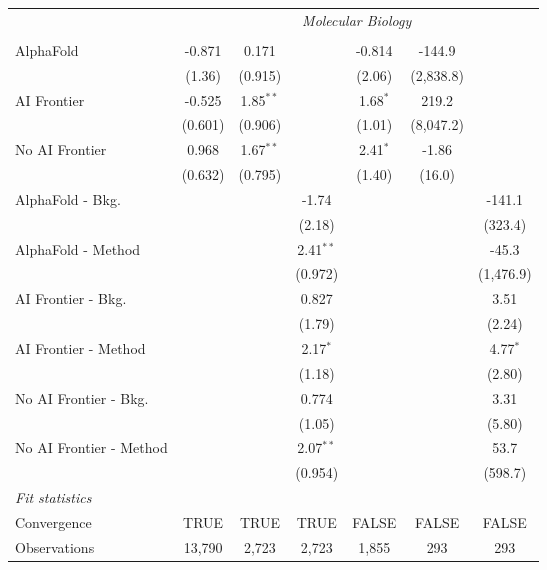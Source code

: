 \begin{tabular}{lcccccc}
 & \multicolumn{6}{c}{\textit{Molecular Biology}} \\ \\
   AlphaFold               & -0.871  & 0.171       &             & -0.814     & -144.9    &   \\   
                           & (1.36)  & (0.915)     &             & (2.06)     & (2,838.8) &   \\   
   AI Frontier             & -0.525  & 1.85$^{**}$ &             & 1.68$^{*}$ & 219.2     &   \\   
                           & (0.601) & (0.906)     &             & (1.01)     & (8,047.2) &   \\   
   No AI Frontier          & 0.968   & 1.67$^{**}$ &             & 2.41$^{*}$ & -1.86     &   \\   
                           & (0.632) & (0.795)     &             & (1.40)     & (16.0)    &   \\   
   AlphaFold - Bkg.        &         &             & -1.74       &            &           & -141.1\\   
                           &         &             & (2.18)      &            &           & (323.4)\\   
   AlphaFold - Method      &         &             & 2.41$^{**}$ &            &           & -45.3\\   
                           &         &             & (0.972)     &            &           & (1,476.9)\\   
   AI Frontier - Bkg.      &         &             & 0.827       &            &           & 3.51\\   
                           &         &             & (1.79)      &            &           & (2.24)\\   
   AI Frontier - Method    &         &             & 2.17$^{*}$  &            &           & 4.77$^{*}$\\   
                           &         &             & (1.18)      &            &           & (2.80)\\   
   No AI Frontier - Bkg.   &         &             & 0.774       &            &           & 3.31\\   
                           &         &             & (1.05)      &            &           & (5.80)\\   
   No AI Frontier - Method &         &             & 2.07$^{**}$ &            &           & 53.7\\   
                           &         &             & (0.954)     &            &           & (598.7)\\   
   \midrule
   \emph{Fit statistics}\\
   Convergence             &TRUE     & TRUE        & TRUE        & FALSE      & FALSE     & FALSE\\  
   Observations            & 13,790  & 2,723       & 2,723       & 1,855      & 293       & 293\\  
   

\end{tabular}
